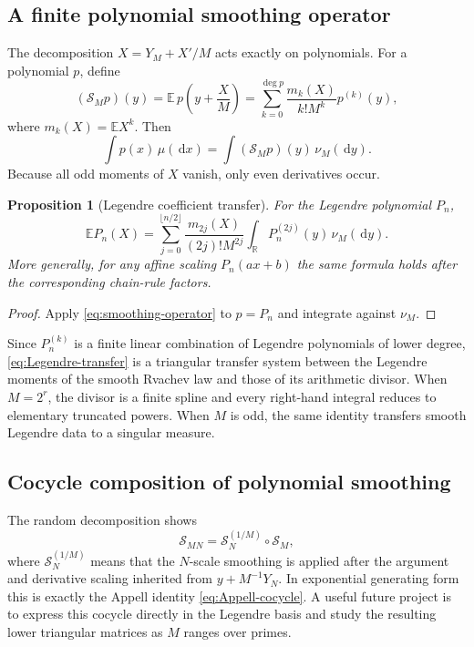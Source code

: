 \documentclass[11pt,oneside]{article}
\newtheorem{proposition}[theorem]{Proposition}
\theoremstyle{definition}
\theoremstyle{remark}
\newcommand{\R}{\mathbb R}
\newcommand{\dd}{\,\mathrm d}
\numberwithin{equation}{section}
\newcommand{\1}{\mathbf 1}
\begin{document}
\subsection{A finite polynomial smoothing operator}

The decomposition $X=Y_M+X'/M$ acts exactly on polynomials.  For a polynomial $p$, define
\begin{equation}
 (\mathcal S_Mp)(y)
 =\mathbb E\,p\!\left(y+\frac XM\right)
 =\sum_{k=0}^{\deg p}\frac{m_k(X)}{k!M^k}p^{(k)}(y),
 \label{eq:smoothing-operator}
\end{equation}
where $m_k(X)=\mathbb EX^k$.  Then
\begin{equation}
 \int p(x)\,\mu(\dd x)
 =\int (\mathcal S_Mp)(y)\,\nu_M(\dd y).
 \label{eq:polynomial-transfer}
\end{equation}
Because all odd moments of $X$ vanish, only even derivatives occur.

\begin{proposition}[Legendre coefficient transfer]
\label{prop:Legendre-transfer}
For the Legendre polynomial $P_n$,
\begin{equation}
 \mathbb E P_n(X)
 =\sum_{j=0}^{\lfloor n/2\rfloor}
 \frac{m_{2j}(X)}{(2j)!M^{2j}}
 \int_{\R}P_n^{(2j)}(y)\,\nu_M(\dd y).
 \label{eq:Legendre-transfer}
\end{equation}
More generally, for any affine scaling $P_n(ax+b)$ the same formula holds after the
corresponding chain-rule factors.
\end{proposition}

\begin{proof}
Apply \eqref{eq:smoothing-operator} to $p=P_n$ and integrate against $\nu_M$.
\end{proof}

Since $P_n^{(k)}$ is a finite linear combination of Legendre polynomials of lower degree,
\eqref{eq:Legendre-transfer} is a triangular transfer system between the Legendre moments
of the smooth Rvachev law and those of its arithmetic divisor.  When $M=2^r$, the divisor
is a finite spline and every right-hand integral reduces to elementary truncated powers.
When $M$ is odd, the same identity transfers smooth Legendre data to a singular measure.

\subsection{Cocycle composition of polynomial smoothing}

The random decomposition shows
\begin{equation}
 \mathcal S_{MN}=\mathcal S_N^{(1/M)}\circ\mathcal S_M,
 \label{eq:S-cocycle-informal}
\end{equation}
where $\mathcal S_N^{(1/M)}$ means that the $N$-scale smoothing is applied after the
argument and derivative scaling inherited from $y+M^{-1}Y_N$.  In exponential generating
form this is exactly the Appell identity \eqref{eq:Appell-cocycle}.  A useful future project
is to express this cocycle directly in the Legendre basis and study the resulting lower
triangular matrices as $M$ ranges over primes.
\end{document}
